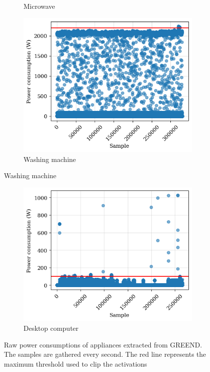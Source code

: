 \begin{figure}
\begin{subfigure}{.5\textwidth}
    \caption{Microwave}
    \label{fig:microwave}
  \end{subfigure}%
  \begin{subfigure}{.5\textwidth}
    \centering
    \includegraphics[width=.9\linewidth]{images/raw_consumptions/washing_machine.png}
    \caption{Washing machine}
    \label{fig:washing_machine}
  \end{subfigure}
\end{figure}%
\begin{figure}\ContinuedFloat
  \begin{subfigure}{\textwidth}
    \centering
    \includegraphics[width=.45\linewidth]{images/raw_consumptions/desktop_computer.png}
    \caption{Desktop computer}
    \label{fig:desktop_computer}
  \end{subfigure}
  \caption[Raw power consumptions of appliances extracted from GREEND]{Raw power consumptions of appliances extracted from GREEND. The samples are gathered every second. The red line represents the maximum threshold used to clip the activations}
  \label{fig:raw_power_consumptions_greend}
\end{figure}


